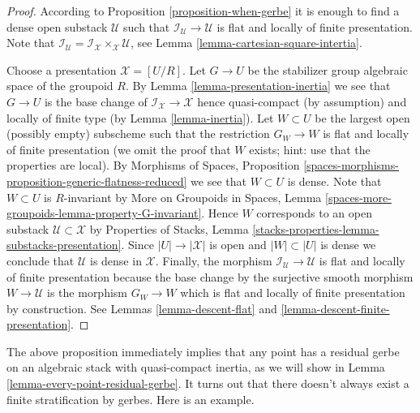 \begin{proof}
According to
Proposition \ref{proposition-when-gerbe}
it is enough to find a dense open substack $\mathcal{U}$ such that
$\mathcal{I}_\mathcal{U} \to \mathcal{U}$ is flat and locally of finite
presentation. Note that
$\mathcal{I}_\mathcal{U} =
\mathcal{I}_\mathcal{X} \times_\mathcal{X} \mathcal{U}$, see
Lemma \ref{lemma-cartesian-square-intertia}.

\medskip\noindent
Choose a presentation $\mathcal{X} = [U/R]$. Let $G \to U$ be the stabilizer
group algebraic space of the groupoid $R$. By
Lemma \ref{lemma-presentation-inertia}
we see that $G \to U$ is the base change of
$\mathcal{I}_\mathcal{X} \to \mathcal{X}$ hence quasi-compact (by assumption)
and locally of finite type (by
Lemma \ref{lemma-inertia}).
Let $W \subset U$ be the largest open (possibly empty) subscheme such that
the restriction $G_W \to W$ is flat and locally of finite presentation
(we omit the proof that $W$ exists; hint: use that the properties are local).
By
Morphisms of Spaces, Proposition
\ref{spaces-morphisms-proposition-generic-flatness-reduced}
we see that $W \subset U$ is dense. Note that $W \subset U$ is $R$-invariant
by
More on Groupoids in Spaces, Lemma
\ref{spaces-more-groupoids-lemma-property-G-invariant}.
Hence $W$ corresponds to an open substack $\mathcal{U} \subset \mathcal{X}$ by
Properties of Stacks, Lemma
\ref{stacks-properties-lemma-substacks-presentation}.
Since $|U| \to |\mathcal{X}|$ is open and $|W| \subset |U|$ is dense we
conclude that $\mathcal{U}$ is dense in $\mathcal{X}$.
Finally, the morphism $\mathcal{I}_\mathcal{U} \to \mathcal{U}$
is flat and locally of finite presentation because the base change by
the surjective smooth morphism $W \to \mathcal{U}$ is the morphism
$G_W \to W$ which is flat and locally of finite presentation by construction.
See
Lemmas \ref{lemma-descent-flat} and
\ref{lemma-descent-finite-presentation}.
\end{proof}

\noindent
The above proposition immediately implies that any point has a residual
gerbe on an algebraic stack with quasi-compact inertia, as we will show in
Lemma \ref{lemma-every-point-residual-gerbe}.
It turns out that there doesn't always exist a finite stratification
by gerbes. Here is an example.

